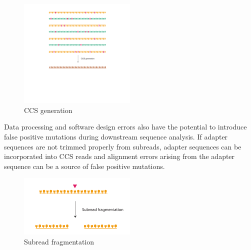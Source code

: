 \begin{figure}[htbp!]
\caption{CCS generation}
\label{figure:ccs-generation}
\begin{centering}
\includegraphics[width=0.5\textwidth]{Vector/ccs-generation.pdf}
\end{centering}
\end{figure}

Data processing and software design errors also have the potential to introduce false positive mutations during downstream sequence analysis. If adapter sequences are not trimmed properly from subreads, adapter sequences can be incorporated into CCS reads and alignment errors arising from the adapter sequence can be a source of false positive mutations. 

\begin{figure}[htbp!]
\caption{Subread fragmentation}
\label{figure:subread-fragmentation}
\begin{centering}
\includegraphics[width=0.5\textwidth]{Vector/subread-fragmentation.pdf}
\end{centering}
\end{figure}

